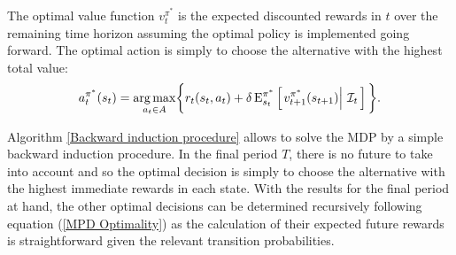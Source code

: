 \noindent The optimal value function $v^{\pi^*}_t$ is the expected discounted rewards in $t$ over the remaining time horizon assuming the optimal policy is implemented going forward. The optimal action is simply to choose the alternative with the highest total value:
%
\begin{align*}
a^{\pi^*}_t(s_t) = \underset{a_t\in A}{\operatorname*{arg\,max}} \bigg\{ r_t(s_t, a_t) + \delta\,\mathrm{E}^{\pi^*}_{s_t} \left[\left.v^{\pi^*}_{t + 1}(s_{t + 1})\right\vert\,\mathcal{I}_t\,\right] \bigg\}.\\
\end{align*}

\noindent Algorithm \ref{Backward induction procedure} allows to solve the MDP by a simple backward induction procedure. In the final period $T$, there is no future to take into account and so the optimal decision is simply to choose the alternative with the highest immediate rewards in each state. With the results for the final period at hand, the other optimal decisions can be determined recursively following equation (\ref{MPD Optimality}) as the calculation of their expected future rewards is straightforward given the relevant transition probabilities.

\vspace{0.5cm}\FloatBarrier
